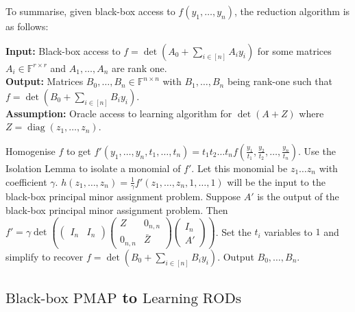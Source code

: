 \documentclass[11pt,letterpaper]{article}
\DeclareMathOperator*{\diag}{diag}
\newcommand{\F}{\mathbb{F}}
\newtheorem{theorem}{Theorem}[section]
\newcommand{\probA}{\text{Learning RODs}}
\newcommand{\probB}{\text{Black-box PMAP}}
\begin{document}
{{{To summarise, given black-box access to $f(y_1,\dots,y_n)$, the reduction algorithm is as follows:

\begin{algorithm}[H]
\caption{Reduction of \probA\, to \probB}
\label{algo:reducing probA to probB}
\textbf{Input:} Black-box access to $f = \det( A_0 + \sum_{i \in [n]} A_i y_i)$ for some matrices $A_i \in\F^{r\times r}$ and $A_1,\dots, A_n$ are rank one.\\
\textbf{Output:} Matrices $B_0, \dots, B_n \in \F^{n\times n}$ with $B_1,\dots,B_n$ being rank-one such that $f = \det( B_0 + \sum_{i \in [n]} B_i y_i)$. \\
\textbf{Assumption:} Oracle access to learning algorithm for $\det(A + Z)$ where $Z = \diag(z_1,\dots,z_n)$.
\begin{algorithmic}[1]
\State Homogenise $f$ to get $f'(y_1,\dots,y_n,t_1,\dots,t_n) = t_1t_2\dots t_nf(\frac{y_1}{t_1}, \frac{y_2}{t_2}, \dots, \frac{y_n}{t_n})$.
\State Use the Isolation Lemma to isolate a monomial of $f'$. Let this monomial be $z_1\dots z_n$ with coefficient $\gamma$.
\State $h(z_1,\dots,z_n) = \frac{1}{\gamma} f'(z_1,\dots,z_n, 1, \dots, 1)$ will be the input to the black-box principal minor assignment problem.
\State Suppose $A'$ is the output of the black-box principal minor assignment problem. Then $f' = \gamma \det\left(\begin{pmatrix}
    I_n & I_n\end{pmatrix}\begin{pmatrix}Z & 0_{n,n} \\ 0_{n,n} & \bar{Z}\end{pmatrix} \begin{pmatrix}I_n \\ A'
\end{pmatrix}\right)$.
\State Set the $t_i$ variables to $1$ and simplify to recover $f = \det(B_0 + \sum_{i \in [n]} B_i y_i)$. Output $B_0, \dots, B_n$.
\end{algorithmic}
\end{algorithm}


\subsection{$\probB$ to $\probA$}


}}}
\end{document}
